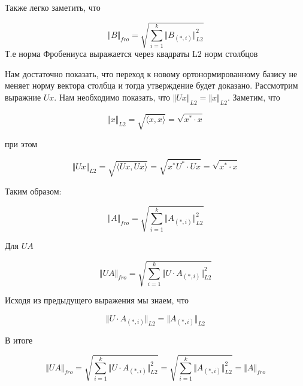 \documentclass{article}
\begin{document}
    \quad 

    Также легко заметить, что 

    \begin{equation}
        \Vert B \Vert_{fro} = \sqrt{ \sum_{i = 1}^{k} \Vert B_{(*, i)} \Vert_{L2}^{2} }
    \end{equation}
    Т.е норма Фробениуса выражается через квадраты L2 норм столбцов
    
    \quad 

    Нам достаточно показать, что переход к новому ортонормированному базису не меняет норму вектора столбца и тогда утверждение будет доказано.
    Рассмотрим выражние $U x$. Нам необходимо показать, что $\Vert Ux \Vert_{L2} = \Vert x \Vert_{L2}$. Заметим, что 

    \begin{equation}
        \Vert x \Vert_{L2} = \sqrt{\langle x, x \rangle} = \sqrt{x^{*} \cdot x}
    \end{equation}

    при этом 

    \begin{equation}
        \Vert Ux \Vert_{L2} = \sqrt{\langle  Ux,  Ux \rangle} = \sqrt{x^{*} U^{*} \cdot U x} = \sqrt{x^{*} \cdot x}
    \end{equation}

    Таким образом: 

    \begin{equation}
        \Vert A \Vert_{fro} = \sqrt{ \sum_{i = 1}^{k} \Vert A_{(*, i)} \Vert_{L2}^{2} }
    \end{equation}

    Для $UA$

    \begin{equation}
        \Vert UA \Vert_{fro} = \sqrt{ \sum_{i = 1}^{k} \Vert U \cdot A_{(*, i)} \Vert_{L2}^{2} }
    \end{equation}

    Исходя из предыдущего выражения мы знаем, что 

    \begin{equation}
        \Vert U \cdot A_{(*, i)} \Vert_{L2} =  \Vert A_{(*, i)} \Vert_{L2}
    \end{equation}

    В итоге 

    
    \begin{equation}
        \Vert UA \Vert_{fro} = \sqrt{ \sum_{i = 1}^{k} \Vert U \cdot A_{(*, i)} \Vert_{L2}^{2} } = \sqrt{ \sum_{i = 1}^{k} \Vert A_{(*, i)} \Vert_{L2}^{2} } = \Vert A \Vert_{fro}
    \end{equation}
\end{document}
